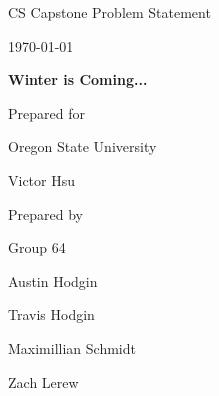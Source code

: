 \documentclass[onecolumn, draftclsnofoot,10pt, compsoc]{IEEEtran}
\def \CapstoneTeamName{							The Party Parrots}
\def \CapstoneTeamNumber{					  64}
\def \GroupMemberOne{				        Austin Hodgin}
\def \GroupMemberTwo{				        Travis Hodgin}
\def \GroupMemberThree{			        Maximillian Schmidt}
\def \GroupMemberFour{		        	Zach Lerew}
\def \CapstoneProjectName{	      	Winter is Coming...}
\def \CapstoneSponsorCompany{		    Oregon State University }
\def \CapstoneSponsorPerson{		 		Victor Hsu}
\def \DocType{		Problem Statement
				}
\newcommand{\NameSigPair}[1]{\par
\makebox[2.75in][r]{#1} \hfil 	\makebox[3.25in]{\makebox[2.25in]{\hrulefill} \hfill		\makebox[.75in]{\hrulefill}}
\par\vspace{-12pt} \textit{\tiny\noindent
\makebox[2.75in]{} \hfil		\makebox[3.25in]{\makebox[2.25in][r]{Signature} \hfill	\makebox[.75in][r]{Date}}}}
\renewcommand{\NameSigPair}[1]{#1}
\begin{document}
\begin{titlepage}
    \begin{singlespace}
        \hfill
        \par\vspace{.2in}
        \centering
        \scshape{
            \huge CS Capstone \DocType \par
            {\large\today}\par
            \vspace{.5in}
            \textbf{\Huge\CapstoneProjectName}\par
						\vspace{1in}
            {\large Prepared for}\par
            \Huge \CapstoneSponsorCompany\par
            \vspace{5pt}
            {\Large\NameSigPair{\CapstoneSponsorPerson}\par}
            {\large Prepared by }\par
            Group\CapstoneTeamNumber\par
            \vspace{5pt}
            {\Large
                \NameSigPair{\GroupMemberOne}\par
            	 \NameSigPair{\GroupMemberTwo}\par
                 \NameSigPair{\GroupMemberThree}\par
		 \NameSigPair{\GroupMemberFour}\par

}}
\end{singlespace}
\end{titlepage}
\end{document}

